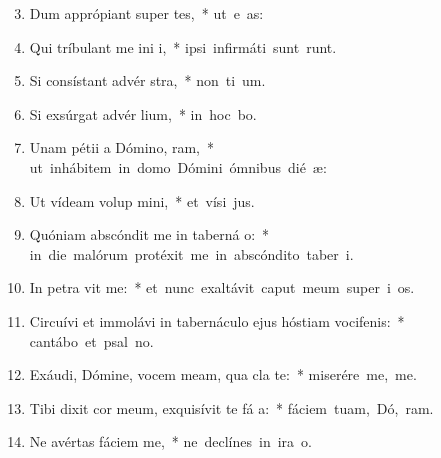 \begin{flushleft}
\begin{enumerate}[leftmargin=*]
\setcounter{enumi}{2}

\item Dum apprópiant super  tes,~* \mbox{ut e  as:}
\item Qui tríbulant me ini i,~* \mbox{ipsi infirmáti sunt  runt.}
\item Si consístant advér  stra,~* \mbox{non ti  um.}
\item Si exsúrgat advér  lium,~* \mbox{in hoc  bo.}
\item Unam pétii a Dómino,  ram,~* \mbox{ut inhábitem in domo Dómini ómnibus dié  æ:}
\item Ut vídeam volup mini,~* \mbox{et vísi  jus.}
\item Quóniam abscóndit me in taberná o:~* \mbox{in die malórum protéxit me in abscóndito taber i.}
\item In petra vit me:~* \mbox{et nunc exaltávit caput meum super i os.}
\item Circuívi et immolávi in tabernáculo ejus hóstiam vocifenis:~* \mbox{cantábo et psal  no.}
\item Exáudi, Dómine, vocem meam, qua cla  te:~* \mbox{miserére me,   me.}
\item Tibi dixit cor meum, exquisívit te fá a:~* \mbox{fáciem tuam, Dó, ram.}
\item Ne avértas fáciem   me,~* \mbox{ne declínes in ira   o.}

\end{enumerate}
\end{flushleft}
